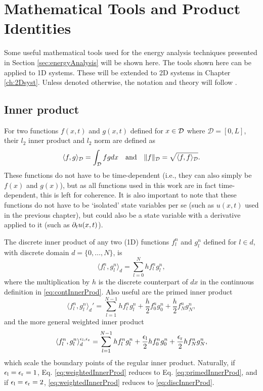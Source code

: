 \section{Mathematical Tools and Product Identities}
Some useful mathematical tools used for the energy analysis techniques presented in Section \ref{sec:energyAnalysis} will be shown here. The tools shown here can be applied to 1D systems. These will be extended to 2D systems in Chapter \ref{ch:2Dsyst}. Unless denoted otherwise, the notation and theory will follow \cite{theBible}.

\subsection{Inner product}\label{sec:innerProduct}
For two functions $f(x,t)$ and $g(x,t)$ defined for $x\in\mathcal{D}$ where $\mathcal{D} = [0,L]$, their $l_2$ inner product and $l_2$ norm are defined as
\begin{equation}\label{eq:contInnerProd}
    \langle f, g\rangle_{\mathcal{D}} = \int_{\mathcal{D}} fg dx \quad \text{and} \quad \lVert f \rVert_{\mathcal{D}} = \sqrt{\langle f, f \rangle_{\mathcal{D}}}.
\end{equation}
These functions do not have to be time-dependent (i.e., they can also simply be $f(x)$ and $g(x)$), but as all functions used in this work are in fact time-dependent, this is left for coherence. It is also important to note that these functions do not have to be `isolated' state variables per se (such as $u(x,t)$ used in the previous chapter), but could also be a state variable with a derivative applied to it (such as $\partial_t u(x,t)$). 

The discrete inner product of any two (1D) functions $f_l^n$ and $g_l^n$ defined for $l \in d$, with discrete domain $d = \{0,\hdots,N\}$, is
\begin{equation}\label{eq:discInnerProd}
    \langle f_l^n, g_l^n \rangle_d = \sum_{l = 0}^N h f_l^n g_l^n,
\end{equation}
where the multiplication by $h$ is the discrete counterpart of $dx$ in the continuous definition in \eqref{eq:contInnerProd}. 
Also useful are the primed inner product
\begin{equation}\label{eq:primedInnerProd}
    \langle f_l^n, g_l^n \rangle_d' = \sum_{l=1}^{N-1} h f_l^n g_l^n + \frac{h}{2}f_0^ng_0^n + \frac{h}{2}f_N^ng_N^n,
\end{equation}
and the more general weighted inner product
\begin{equation}\label{eq:weightedInnerProd}
    \langle f_l^n, g_l^n \rangle_d^{\epsilon_\text{l}, \epsilon_\text{r}} = \sum_{l=1}^{N-1} h f_l^n g_l^n + \frac{\epsilon_\text{l}}{2}hf_0^ng_0^n + \frac{\epsilon_\text{r}}{2}hf_N^ng_N^n,
\end{equation}
which scale the boundary points of the regular inner product. Naturally, if $\epsilon_\text{l} = \epsilon_\text{r} = 1$, Eq. \eqref{eq:weightedInnerProd} reduces to Eq. \eqref{eq:primedInnerProd}, and if $\epsilon_\text{l} = \epsilon_\text{r} = 2$, \eqref{eq:weightedInnerProd} reduces to \eqref{eq:discInnerProd}.

